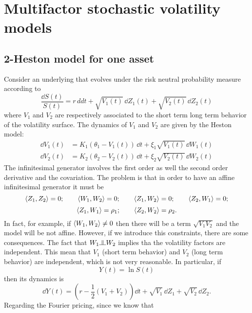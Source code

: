 \section{Multifactor stochastic volatility models}
\subsection{2-Heston model for one asset}
Consider an underlying that evolves under the risk neutral probability measure according to
\begin{equation}
    \frac{\dd S(t)}{S(t)} = r\,dd t + \sqrt{V_1(t)}\,\dd Z_1(t) + \sqrt{V_2(t)}\,\dd Z_2(t)
\end{equation}
where $V_1$ and $V_2$ are respectively associated to the short term long term behavior of the volatility surface. The dynamics of $V_1$ and $V_2$ are given by the Heston model:
\begin{align}
    \dd V_1(t) &= K_1(\theta_1 - V_1(t))\,\dd t + \xi_1\sqrt{V_1(t)}\,\dd W_1(t) \\
    \dd V_2(t) &= K_2(\theta_2 - V_2(t))\,\dd t + \xi_2\sqrt{V_2(t)}\,\dd W_2(t)
\end{align}
The infinitesimal generator involves the first order as well the second order derivative and the covariation. The problem is that in order to have an affine infinitesimal generator it must be
\begin{equation*}
    \expval{Z_1,Z_2} = 0; \qquad \expval{W_1,W_2} = 0; \qquad \expval{Z_1,W_2} = 0; \qquad \expval{Z_2,W_1} = 0;
\end{equation*}
\begin{equation*}
    \expval{Z_1,W_1} = \rho_1; \qquad \expval{Z_2,W_2} = \rho_2.
\end{equation*}
In fact, for example, if $\expval{W_1,W_2}\ne 0$ then there will be a term $\sqrt{V_1V_2}$ and the model will be not affine. However, if we introduce this constraints, there are some consequences. The fact that $W_1 \indep W_2$ implies tha the volatility factors are independent. This mean that $V_1$ (short term behavior) and $V_2$ (long term behavior) are independent, which is not very reasonable. In particular, if
\begin{equation}
    Y(t) = \ln S(t)
\end{equation}
then its dynamics is
\begin{equation}
    \dd Y(t) = \left(r-\frac{1}{2}(V_1+V_2)\right)\dd t + \sqrt{V_1}\,\dd Z_1 + \sqrt{V_2}\,\dd Z_2.
\end{equation}
Regarding the Fourier pricing, since we know that
